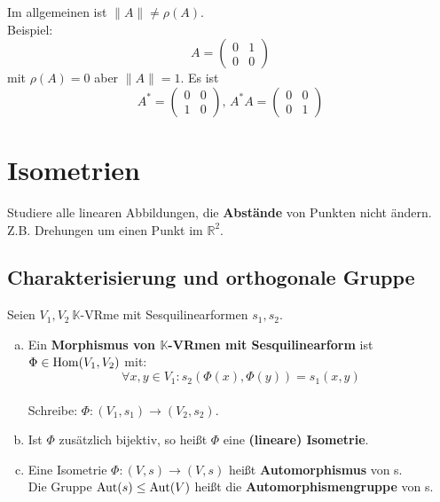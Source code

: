 \documentclass[parskip,a4paper,twoside,DIV15,BCOR12mm]{scrbook}
\begin{document}
\begin{caution}
Im allgemeinen ist \(\lVert A\rVert\neq\rho(A)\).\\
Beispiel: 
\[
A=\begin{pmatrix}0&1\\0&0\end{pmatrix}
\] 
mit \(\rho(A)=0\) aber \(\lVert A\rVert=1\).
Es ist
\[
A^{*}=\begin{pmatrix}0&0\\1&0\end{pmatrix},\,A^{*}A=\begin{pmatrix}0&0\\0&1\end{pmatrix}
\]
\end{caution}

\chapter{Isometrien}

\begin{task}
Studiere alle linearen Abbildungen, die \textbf{Abstände} von Punkten nicht ändern.
Z.B. Drehungen um einen Punkt im $\mathbb{R}^2$.
\end{task}

\section{Charakterisierung und orthogonale Gruppe}
\begin{definition}
Seien $V_1,V_2\ \mathbb{K}$-VRme mit Sesquilinearformen $s_1,s_2$.
\begin{enumerate}[(a)]
\item Ein \textbf{Morphismus von $\pmb{\mathbb{K}}$-VRmen mit Sesquilinearform} ist
$\Phi\in \operatorname{Hom}(V_1,V_2)$ mit:\\
\[\forall x,y\in V_1:s_2(\Phi(x),\Phi(y))=s_1(x,y)\]\\
Schreibe: $\Phi:(V_1,s_1)\to (V_2,s_2)$.
\item Ist $\Phi$ zusätzlich bijektiv, so heißt $\Phi$ eine \textbf{(lineare) Isometrie}.
\item Eine Isometrie $\Phi:(V,s)\to (V,s)$ heißt \textbf{Automorphismus} von s.\\
Die Gruppe $\operatorname{Aut}(s)\le\operatorname{Aut}(V)$ heißt die \textbf{Automorphismengruppe} von s.
\end{enumerate}
\end{definition}
\end{document}
